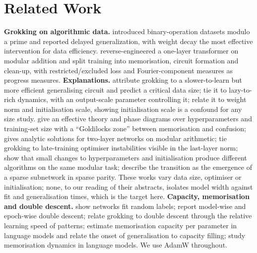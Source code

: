 \documentclass{article}
\begin{document}
\section{Related Work}
\textbf{Grokking on algorithmic data.} \citet{power2022grokking} introduced binary-operation datasets modulo a prime and reported delayed generalization, with weight decay the most effective intervention for data efficiency. \citet{nanda2023progress} reverse-engineered a one-layer transformer on modular addition and split training into memorisation, circuit formation and clean-up, with restricted/excluded loss and Fourier-component measures as progress measures.
\textbf{Explanations.} \citet{varma2023explaining} attribute grokking to a slower-to-learn but more efficient generalising circuit and predict a critical data size; \citet{kumar2024grokking} tie it to lazy-to-rich dynamics, with an output-scale parameter controlling it; \citet{liu2023omnigrok} relate it to weight norm and initialisation scale, showing initialisation scale is a confound for any size study.
\citet{liu2022towards} give an effective theory and phase diagrams over hyperparameters and training-set size with a ``Goldilocks zone'' between memorisation and confusion; \citet{gromov2023grokking} gives analytic solutions for two-layer networks on modular arithmetic; \citet{thilak2022slingshot} tie grokking to late-training optimiser instabilities visible in the last-layer norm; \citet{zhong2023clock} show that small changes to hyperparameters and initialisation produce different algorithms on the same modular task; \citet{merrill2023tale} describe the transition as the emergence of a sparse subnetwork in sparse parity. These works vary data size, optimiser or initialisation; none, to our reading of their abstracts, isolates model width against fit and generalisation times, which is the target here.
\textbf{Capacity, memorisation and double descent.} \citet{zhang2017understanding} show networks fit random labels; \citet{nakkiran2020deep} report model-wise and epoch-wise double descent; \citet{davies2023unifying} relate grokking to double descent through the relative learning speed of patterns; \citet{morris2025memorize} estimate memorisation capacity per parameter in language models and relate the onset of generalisation to capacity filling; \citet{tirumala2022memorization} study memorisation dynamics in language models. We use AdamW \citep{loshchilov2017decoupled} throughout.
\end{document}
